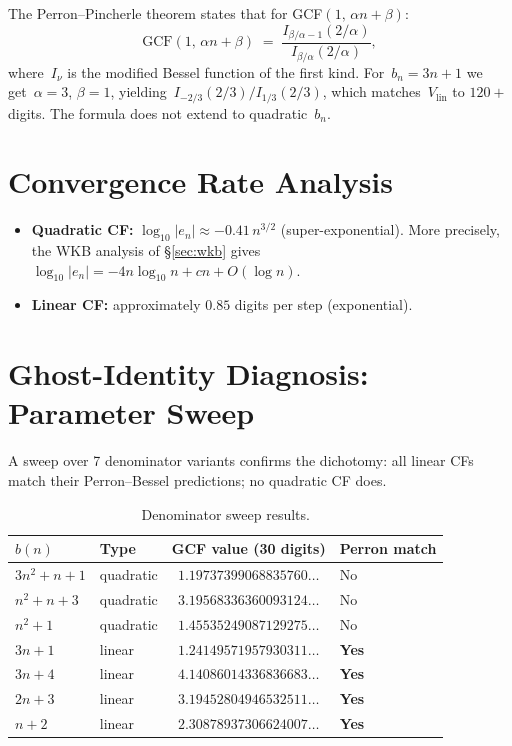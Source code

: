 \documentclass[11pt,a4paper]{article}
\begin{document}
The Perron--Pincherle theorem states that for GCF$(1,\,\alpha n + \beta)$:
\begin{equation}\label{eq:perron}
  \text{GCF}(1,\,\alpha n + \beta) \;=\; \frac{I_{\beta/\alpha - 1}(2/\alpha)}{I_{\beta/\alpha}(2/\alpha)},
\end{equation}
where~$I_\nu$ is the modified Bessel function of the first kind. For~$b_n = 3n+1$ we get~$\alpha=3$, $\beta=1$, yielding~$I_{-2/3}(2/3)/I_{1/3}(2/3)$, which matches~$V_{\mathrm{lin}}$ to $120{+}$ digits. The formula does not extend to quadratic~$b_n$.

\section{Convergence Rate Analysis}\label{sec:convergence}

\begin{itemize}
  \item \textbf{Quadratic CF:} $\log_{10}|e_n| \approx -0.41\,n^{3/2}$ (super-exponential). More precisely, the WKB analysis of \S\ref{sec:wkb} gives~$\log_{10}|e_n| = -4n\log_{10}n + cn + O(\log n)$.
  \item \textbf{Linear CF:} approximately $0.85$ digits per step (exponential).
\end{itemize}

\section{Ghost-Identity Diagnosis: Parameter Sweep}\label{sec:sweep}

A sweep over 7 denominator variants confirms the dichotomy: all linear CFs match their Perron--Bessel predictions; no quadratic CF does.

\begin{table}[ht]
\centering
\caption{Denominator sweep results.}
\label{tab:sweep}
\begin{tabular}{@{}llcl@{}}
\toprule
$b(n)$ & Type & GCF value (30 digits) & Perron match \\
\midrule
$3n^2+n+1$ & quadratic & $1.19737399068835760\ldots$ & No \\
$n^2+n+3$  & quadratic & $3.19568336360093124\ldots$ & No \\
$n^2+1$    & quadratic & $1.45535249087129275\ldots$ & No \\
$3n+1$     & linear    & $1.24149571957930311\ldots$ & \textbf{Yes} \\
$3n+4$     & linear    & $4.14086014336836683\ldots$ & \textbf{Yes} \\
$2n+3$     & linear    & $3.19452804946532511\ldots$ & \textbf{Yes} \\
$n+2$      & linear    & $2.30878937306624007\ldots$ & \textbf{Yes} \\
\bottomrule
\end{tabular}
\end{table}
\end{document}
